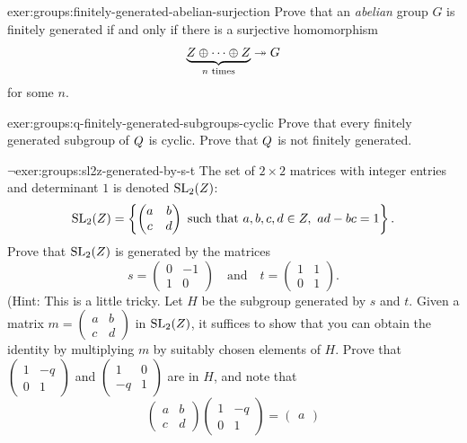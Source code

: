 \begin{exer}{}{exer:groups:finitely-generated-abelian-surjection}
  Prove that an \emph{abelian} group $G$ is finitely generated if and
  only if there is a surjective homomorphism
  \[
    \underbrace{Z \oplus \cdots \oplus Z}_{n\text{ times}}
    \twoheadrightarrow G
  \]
  for some $n$.
\end{exer}
\begin{exer}{}{exer:groups:q-finitely-generated-subgroups-cyclic}
  Prove that every finitely generated subgroup of $Q$ is cyclic.
  Prove that $Q$ is not finitely generated.
\end{exer}
\begin{exer}{$\lnot$}{exer:groups:sl2z-generated-by-s-t}
  The set of $2 \times 2$ matrices with integer entries and
  determinant $1$ is denoted $\mathrm{SL}_2(Z)$:
  \[
    \mathrm{SL}_2(Z) = \left\{ \begin{pmatrix} a & b \\ c &
        d \end{pmatrix} \text{ such that } a,b,c,d \in Z,\ ad-bc=1
    \right\}.
  \]
  Prove that $\mathrm{SL}_2(Z)$ is generated by the matrices
  \[
    s = \begin{pmatrix} 0 & -1 \\ 1 & 0 \end{pmatrix} \quad \text{and}
    \quad t = \begin{pmatrix} 1 & 1 \\ 0 & 1 \end{pmatrix}.
  \]
  (Hint: This is a little tricky. Let $H$ be the subgroup generated by
  $s$ and $t$. Given a matrix
  $m = \begin{pmatrix} a & b \\ c & d \end{pmatrix}$ in
  $\mathrm{SL}_2(Z)$, it suffices to show that you can obtain the
  identity by multiplying $m$ by suitably chosen elements of $H$.
  Prove that $\begin{pmatrix} 1 & -q \\ 0 & 1 \end{pmatrix}$ and
  $\begin{pmatrix} 1 & 0 \\ -q & 1 \end{pmatrix}$ are in $H$, and note
  that
  \[
    \begin{pmatrix} a & b \\ c & d \end{pmatrix}
    \begin{pmatrix} 1 & -q \\ 0 & 1 \end{pmatrix} = \begin{pmatrix} a

\end{pmatrix}\]
\end{exer}
